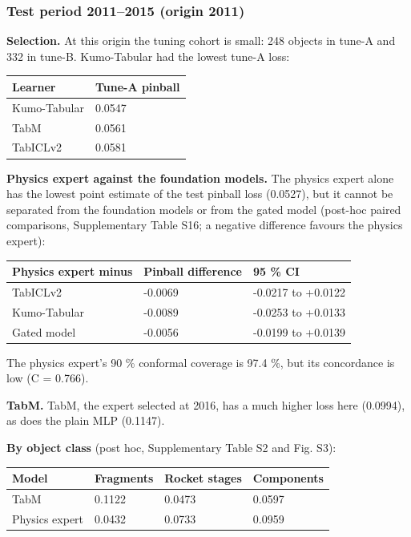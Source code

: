 \documentclass[
]{article}
\newcounter{none} %
\begin{document}
\subsubsection{Test period 2011--2015 (origin
2011)}\label{test-period-20112015-origin-2011}

\textbf{Selection.} At this origin the tuning cohort is small: 248
objects in tune-A and 332 in tune-B. Kumo-Tabular had the lowest tune-A
loss:

{\def\LTcaptype{none} %
\begin{longtable}[]{@{}ll@{}}
\toprule\noalign{}
Learner & Tune-A pinball \\
\midrule\noalign{}
\endhead
\bottomrule\noalign{}
\endlastfoot
Kumo-Tabular & 0.0547 \\
TabM & 0.0561 \\
TabICLv2 & 0.0581 \\
\end{longtable}
}

\textbf{Physics expert against the foundation models.} The physics
expert alone has the lowest point estimate of the test pinball loss
(0.0527), but it cannot be separated from the foundation models or from
the gated model (post-hoc paired comparisons, Supplementary Table S16; a
negative difference favours the physics expert):

{\def\LTcaptype{none} %
\begin{longtable}[]{@{}lll@{}}
\toprule\noalign{}
Physics expert minus & Pinball difference & 95 \% CI \\
\midrule\noalign{}
\endhead
\bottomrule\noalign{}
\endlastfoot
TabICLv2 & -0.0069 & -0.0217 to +0.0122 \\
Kumo-Tabular & -0.0089 & -0.0253 to +0.0133 \\
Gated model & -0.0056 & -0.0199 to +0.0139 \\
\end{longtable}
}

The physics expert's 90 \% conformal coverage is 97.4 \%, but its
concordance is low (C = 0.766).

\textbf{TabM.} TabM, the expert selected at 2016, has a much higher loss
here (0.0994), as does the plain MLP (0.1147).

\textbf{By object class} (post hoc, Supplementary Table S2 and Fig. S3):

{\def\LTcaptype{none} %
\begin{longtable}[]{@{}llll@{}}
\toprule\noalign{}
Model & Fragments & Rocket stages & Components \\
\midrule\noalign{}
\endhead
\bottomrule\noalign{}
\endlastfoot
TabM & 0.1122 & 0.0473 & 0.0597 \\
Physics expert & 0.0432 & 0.0733 & 0.0959 \\
\end{longtable}
}
\end{document}
